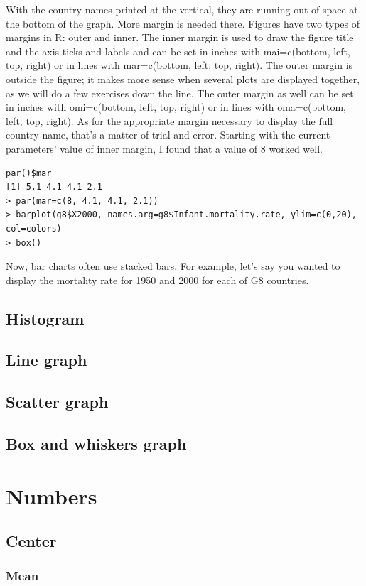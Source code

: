 \documentclass{report}
\newcommand{\code}[1]{\textsf{\ttfamily #1}}
\begin{document}
With the country names printed at the vertical, they are running out of space at the bottom of the graph. More margin is needed there. Figures have two types of margins in R: outer and inner. The inner margin is used to draw the figure title and the axis ticks and labels and can be set in inches with \code{mai=c(bottom, left, top, right)} or in lines with \code{mar=c(bottom, left, top, right)}. The outer margin is outside the figure; it makes more sense when several plots are displayed together, as we will do a few exercises down the line. The outer margin as well can be set in inches with \code{omi=c(bottom, left, top, right)} or in lines with \code{oma=c(bottom, left, top, right)}. As for the appropriate margin necessary to display the full country name, that's a matter of trial and error. Starting with the current parameters' value of inner margin, I found that a value of 8 worked well.
\begin{verbatim}
par()$mar
[1] 5.1 4.1 4.1 2.1
> par(mar=c(8, 4.1, 4.1, 2.1))
> barplot(g8$X2000, names.arg=g8$Infant.mortality.rate, ylim=c(0,20), col=colors)
> box()
\end{verbatim}

Now, bar charts often use stacked bars. For example, let's say you wanted to display the mortality rate for 1950 and 2000 for each of G8 countries.

	\subsection{Histogram}
	\subsection{Line graph}
	\subsection{Scatter graph}
	\subsection{Box and whiskers graph}
	\section{Numbers}
	\subsection{Center}
	\subsubsection{Mean}
\end{document}

